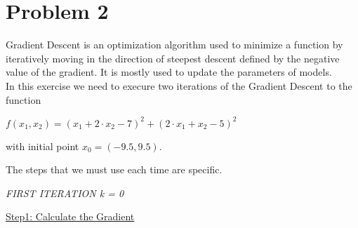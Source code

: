
\section{Problem 2}
Gradient Descent is an optimization algorithm used to minimize a function by iteratively moving in the direction of steepest descent defined by the negative value of the gradient. It is mostly used to update the parameters of models.\\
In this exercise we need to execure two iterations of the Gradient Descent to the function
\begin{center}
$	f(x_1,x_2) = (x_1+2 \cdot x_2 - 7)^2 + (2 \cdot x_1 + x_2 -5)^2$
\end{center}
with initial point $x_0 = (-9.5,9.5)$.

The steps that we must use each time are specific.
\begin{center}
	\textit{FIRST ITERATION k = 0}
\end{center}
\underline{Step1: Calculate the Gradient}
